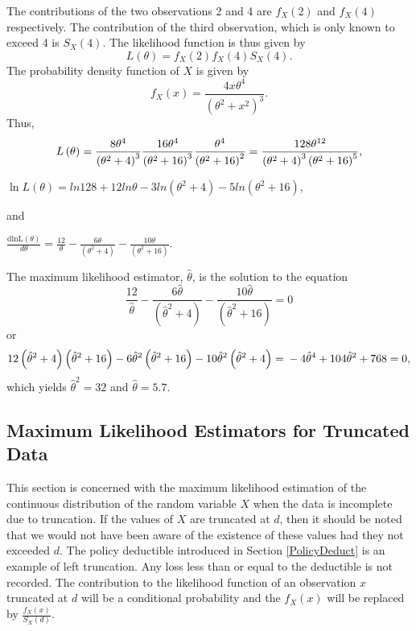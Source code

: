 \documentclass[]{book}
\theoremstyle{definition}
\theoremstyle{definition}
\theoremstyle{definition}
\theoremstyle{remark}
\begin{document}
The contributions of the two observations 2 and 4 are
\(f_{X}\left( 2 \right)\) and \(f_{X}\left( 4 \right)\) respectively.
The contribution of the third observation, which is only known to exceed
4 is \(S_{X}\left( 4 \right)\). The likelihood function is thus given by
\[L\left( \theta \right) = f_{X}\left( 2 \right)f_{X}\left( 4 \right)S_{X}\left( 4 \right).\]
The probability density function of \(X\) is given by
\[f_{X}\left( x \right) = \frac{4x\theta^{4}}{\left( \theta^{2} + x^{2} \right)^{3}}.\]
Thus,
\[L\left( \theta \right) = \frac{8\theta^{4}}{\left( \theta^{2} + 4 \right)^{3}}\frac{16\theta^{4}}{\left( \theta^{2} + 16 \right)^{3}}\frac{\theta^{4}}{\left( \theta^{2} + 16 \right)^{2}} = \\
\frac{128\theta^{12}}{\left( \theta^{2} + 4 \right)^{3}\left( \theta^{2} + 16 \right)^{5}},\]

\(\ln L\left( \theta \right) = ln128 + 12ln\theta - 3ln\left( \theta^{2} + 4 \right) - 5ln\left( \theta^{2} + 16 \right)\),

and

\(\frac{\text{dlnL}\left( \theta \right)}{d \theta} = \frac{12}{\theta} - \frac{6\theta}{\left( \theta^{2} + 4 \right)} - \frac{10\theta}{\left( \theta^{2} + 16 \right)}\).

The maximum likelihood estimator, \(\hat{\theta}\), is the solution to
the equation
\[\frac{12}{\hat{\theta}} - \frac{6\hat{\theta}}{\left( {\hat{\theta}}^{2} + 4 \right)} - \frac{10\hat{\theta}}{\left( {\hat{\theta}}^{2} + 16 \right)} = 0\]
or
\[12\left( {\hat{\theta}}^{2} + 4 \right)\left( {\hat{\theta}}^{2} + 16 \right) - 6{\hat{\theta}}^{2}\left( {\hat{\theta}}^{2} + 16 \right) - 10{\hat{\theta}}^{2}\left( {\hat{\theta}}^{2} + 4 \right) = \\
- 4{\hat{\theta}}^{4} + 104{\hat{\theta}}^{2} + 768 = 0,\] which yields
\({\hat{\theta}}^{2} = 32\) and \(\hat{\theta} = 5.7\).

\subsection{Maximum Likelihood Estimators for Truncated
Data}\label{maximum-likelihood-estimators-for-truncated-data}

This section is concerned with the maximum likelihood estimation of the
continuous distribution of the random variable \(X\) when the data is
incomplete due to truncation. If the values of \(X\) are truncated at
\(d\), then it should be noted that we would not have been aware of the
existence of these values had they not exceeded \(d\). The policy
deductible introduced in Section \ref{PolicyDeduct} is an example of
left truncation. Any loss less than or equal to the deductible is not
recorded. The contribution to the likelihood function of an observation
\(x\) truncated at \(d\) will be a conditional probability and the
\(f_{X}\left( x \right)\) will be replaced by
\(\frac{f_{X}\left( x \right)}{S_{X}\left( d \right)}\).
\end{document}
